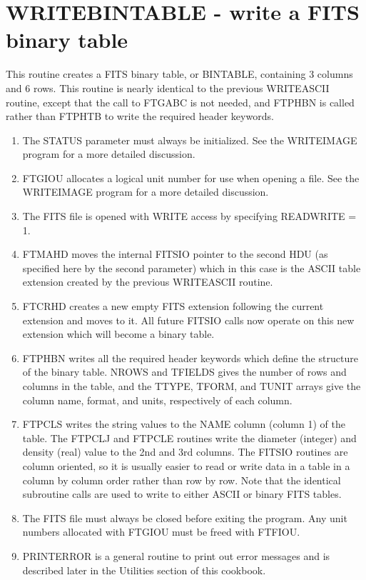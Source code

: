 \section{WRITEBINTABLE - write a FITS binary table}

This routine creates a FITS binary table, or BINTABLE, containing
3 columns and 6 rows.  This routine is nearly identical to the
previous WRITEASCII routine, except that the call to FTGABC is not
needed, and FTPHBN is called rather than FTPHTB to write the
required header keywords.

\begin{enumerate}
\item
The STATUS parameter must always be initialized.  See the WRITEIMAGE 
program for a more detailed discussion.

\item
FTGIOU allocates a logical unit number for use when opening a file.
See the WRITEIMAGE program for a more detailed discussion.

\item
The FITS file is opened with WRITE access by specifying READWRITE = 1.
\item
FTMAHD moves the internal FITSIO pointer to the second HDU (as specified
here by the second parameter) which in this case is the ASCII table
extension created by the previous WRITEASCII routine.
\item
FTCRHD creates a new empty FITS extension following the
current extension and moves to it.  All future FITSIO calls
now operate on this new extension which will become a binary table.

\item
FTPHBN writes all the required header keywords which define the
structure of the binary table. NROWS and TFIELDS gives the number of
rows and columns in the table, and the TTYPE, TFORM, and TUNIT arrays
give the column name, format, and units, respectively of each column.

\item
FTPCLS writes the string values to the NAME column (column 1) of the
table.  The FTPCLJ and FTPCLE routines write the diameter (integer) and
density (real) value to the 2nd and 3rd columns.  The FITSIO routines
are column oriented, so it is usually easier to read or write data in a
table in a column by column order rather than row by row.  Note that
the identical subroutine calls are used to write to either ASCII or
binary FITS tables.
\item
The FITS file must always be closed before exiting the program. 
Any unit numbers allocated with FTGIOU must be freed with FTFIOU.
\item
PRINTERROR is a general routine to print out error messages and is
described later in the Utilities section of this cookbook.
\end{enumerate}

